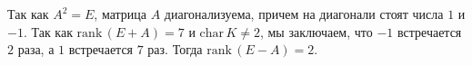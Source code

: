 \documentclass{article}
\begin{document}
Так как $A^2 = E$, матрица $A$ диагонализуема, причем на диагонали стоят числа $1$ и $-1$. Так как $\mathrm{rank}\,(E+A)=7$ и $\mathrm{char}\,K \neq 2$, мы заключаем, что 
$-1$ встречается $2$ раза, а $1$ встречается $7$ раз. Тогда $\mathrm{rank}\,(E-A)=2$.
\end{document}
